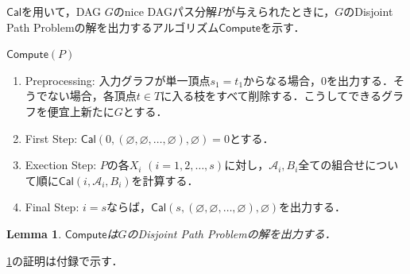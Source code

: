 \documentclass[master]{kuisthesis}		%
\theoremstyle{plain}
\newtheorem{lemma}{Lemma}
\theoremstyle{definition}
\begin{document}
$\mathsf{Cal}$を用いて，DAG $G$のnice DAGパス分解$P$が与えられたときに，$G$のDisjoint Path Problemの解を出力するアルゴリズム$\mathsf{Compute}$を示す．


$\mathsf{Compute}(P)$

\begin{enumerate}
    \item Preprocessing: 入力グラフが単一頂点$s_1=t_1$からなる場合，0を出力する．そうでない場合，各頂点$t \in T$に入る枝をすべて削除する．こうしてできるグラフを便宜上新たに$G$とする．
    \item First Step: $\mathsf{Cal}(0, (\varnothing, \varnothing, \dots, \varnothing), \varnothing) = 0$とする．
    \item Exection Step: $P$の各$X_i$ $(i=1, 2, \dots, s)$に対し，$\mathscr{A}_i, B_i$全ての組合せについて順に$\mathsf{Cal}(i, \mathscr{A}_i, B_i)$を計算する．
    \item Final Step: $i = s$ならば，$\mathsf{Cal}(s, (\varnothing, \varnothing, \dots, \varnothing), \varnothing)$を出力する．
\end{enumerate}


\begin{lemma}\label{dpp}
    $\mathsf{Compute}$は$G$のDisjoint Path Problemの解を出力する．
\end{lemma}

\ref{dpp}の証明は付録で示す．
\end{document}

